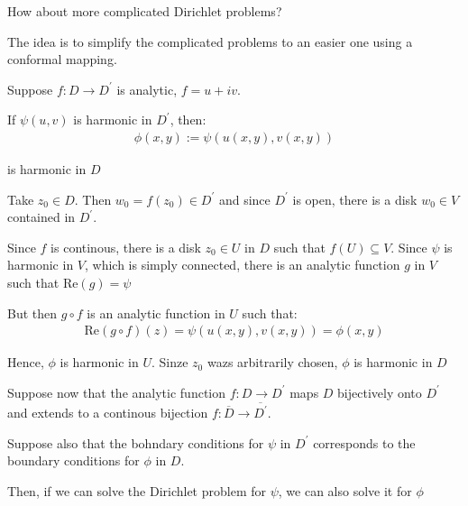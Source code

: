 \par\bigskip
\noindent How about more complicated Dirichlet problems?\par
\noindent The idea is to simplify the complicated problems to an easier one using a conformal mapping.
\par\bigskip
\begin{theo}[]{}
  Suppose $f:D\to D^{\prime}$ is analytic, $f = u+iv$.\par
  \noindent If $\psi(u,v)$ is harmonic in $D^{\prime}$, then:
  \begin{equation*}
    \begin{gathered}
      \phi(x,y):= \psi(u(x,y),v(x,y))
    \end{gathered}
  \end{equation*}\par
  \noindent is harmonic in $D$
\end{theo}
\par\bigskip
\begin{prf}[]{}
  Take $z_0\in D$. Then $w_0 = f(z_0)\in D^{\prime}$ and since $D^{\prime}$  is open, there is a disk $w_0\in V$  contained in $D^{\prime}$.
  \par\bigskip
  \noindent Since $f$ is continous, there is a disk $z_0\in U$ in $D$ such that $f(U)\subseteq V$. Since $\psi$ is harmonic in $V$, which is simply connected, there is an analytic function $g$  in $V$  such that $\text{Re}(g) = \psi$
  \par\bigskip
  \noindent But then $g\circ f$ is an analytic function in $U$ such that:
  \begin{equation*}
    \begin{gathered}
      \text{Re}(g\circ f)(z) = \psi(u(x,y),v(x,y)) = \phi(x,y)
    \end{gathered}
  \end{equation*}
  \par\bigskip
  \noindent Hence, $\phi$ is harmonic in $U$. Sinze $z_0$ wazs arbitrarily chosen, $\phi$ is harmonic in $D$
\end{prf}
\par\bigskip
\noindent Suppose now that the analytic function $f:D\to D^{\prime}$ maps $D$ bijectively onto $D^{\prime}$ and extends to a continous bijection $f:\overline{D}\to \overline{D^{\prime}}$.\par
\noindent Suppose also that the bohndary conditions for $\psi$ in $D^{\prime}$ corresponds to the boundary conditions for $\phi$ in $D$.
\par\bigskip
\noindent Then, if we can solve the Dirichlet problem for $\psi$, we can also solve it for $\phi$
